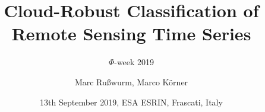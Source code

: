 \documentclass[%
  aspectratio=169,
  9pt,
  USenglish,
  light,
  mathserif,
  professionalfont,
  affiliationintitlepagehead,
  titlegraphic,
   affiliation,
]{beamer}
\title{Cloud-Robust Classification of Remote Sensing Time Series}
\subtitle{$\Phi$-week 2019}
\author[M. Rußwurm, M. Körner]{Marc Rußwurm, Marco Körner}
\institute[TUM]{%
}
\date{13th September 2019, ESA ESRIN, Frascati, Italy}
\begin{document}
\begin{frame}[t]
  \titlepage
\end{frame}

%	
%
%

	
\end{document}
